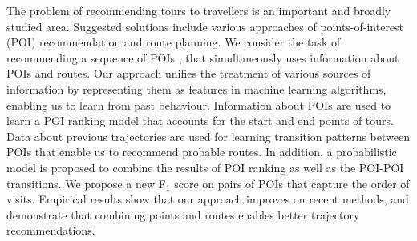 
The problem of recommending tours to travellers is an important and broadly studied area.
Suggested solutions include various approaches of points-of-interest (POI)
recommendation and route planning.
We consider the task of recommending a sequence of POIs 
, that simultaneously uses information about POIs and routes.
Our approach unifies the treatment of various sources of information
by representing them as features in machine learning algorithms, enabling us to
learn from past behaviour. %
Information about POIs are used to learn a POI ranking model
that accounts for the start and end points of tours.
Data about previous trajectories are used for learning transition patterns between POIs that
enable us to recommend probable routes.
In addition, a probabilistic model is proposed
to combine the results of POI ranking as well as the POI-POI transitions.
We propose a new F$_1$ score on pairs of POIs
that capture the order of visits.
Empirical results show that our approach improves on
recent methods, and demonstrate that
combining points and routes enables better trajectory recommendations.
